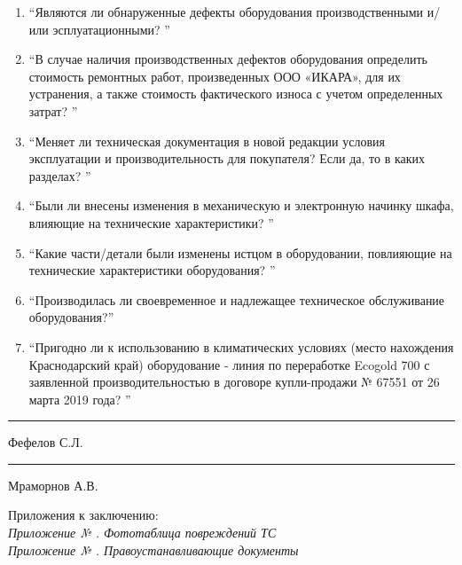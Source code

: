 \begin{enumerate}
\item \enquote{Являются ли обнаруженные дефекты оборудования производственными и/или эсплуатационными? }

\item \enquote{В случае наличия производственных дефектов оборудования определить стоимость ремонтных работ, произведенных ООО «ИКАРА», для их устранения, а также стоимость фактического износа с учетом определенных затрат? }

\item \enquote{Меняет ли техническая документация в новой редакции условия эксплуатации и производительность для покупателя? Если да, то в каких разделах? }

\item \enquote{Были ли внесены изменения в механическую и электронную начинку шкафа, влияющие на технические характеристики? }

\item \enquote{Какие части/детали были изменены истцом в оборудовании, повлияющие на технические характеристики оборудования? }

\item \enquote{Производилась ли своевременное и надлежащее техническое обслуживание оборудования?}

\item \enquote{Пригодно ли к использованию в климатических условиях (место нахождения 	Краснодарский край) оборудование - линия по переработке Ecogold 700 с заявленной производительностью в договоре купли-продажи № 67551 от 26 		марта 2019 года? }
\end{enumerate}


\vspace{10mm}
  \hfill    \rule{45mm}{0.1 mm}     {Фефелов С.Л.}\\

\vspace{1mm}

  \hfill    \rule{45mm}{0.1 mm}   {Мраморнов А.В.}\\
\vspace{7mm}
\relax



\noindent Приложения к заключению:\\

\noindent \textit{\small 
	Приложение № \Rownum. Фототаблица повреждений ТС \\
	Приложение № \Rownum. Правоустанавливающие документы\\}

\pagebreak
%
